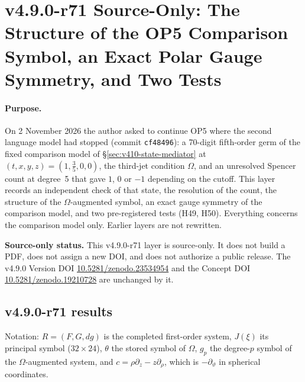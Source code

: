 \clearpage
\section*{v4.9.0-r71 Source-Only: The Structure of the OP5 Comparison Symbol, an Exact Polar Gauge Symmetry, and Two Tests}
\label{sec:v490-r71-op5-symbol}

\paragraph{Purpose.}
On 2 November 2026 the author asked to continue OP5 where the second language model had stopped (commit \texttt{cf48496}): a
70-digit fifth-order germ of the fixed comparison model of \S\ref{sec:v410-state-mediator} at \((t,x,y,z)=(1,\tfrac35,0,0)\),
the third-jet condition \(\Omega\), and an unresolved Spencer count at degree~5 that gave \(1\), \(0\) or \(-1\) depending on the
cutoff.  This layer records an independent check of that state, the resolution of the count, the structure of the
\(\Omega\)-augmented symbol, an exact gauge symmetry of the comparison model, and two pre-registered tests (H49, H50).
Everything concerns the comparison model only.  Earlier layers are not rewritten.

\noindent\textbf{Source-only status.}
This v4.9.0-r71 layer is source-only.  It does not build a PDF, does not assign a new DOI,
and does not authorize a public release.  The v4.9.0 Version DOI
\href{https://doi.org/10.5281/zenodo.23534954}{10.5281/zenodo.23534954} and the Concept DOI
\href{https://doi.org/10.5281/zenodo.19210728}{10.5281/zenodo.19210728} are unchanged by it.

\subsection*{v4.9.0-r71 results}
\label{subsec:v490-r71-results}

Notation: \(R=(F,G,dg)\) is the completed first-order system, \(J(\xi)\) its principal symbol (\(32\times24\)), \(\theta\) the
stored symbol of \(\Omega\), \(g_p\) the degree-\(p\) symbol of the \(\Omega\)-augmented system, and
\(c=\rho\partial_z-z\partial_\rho\), which is \(-\partial_\vartheta\) in spherical coordinates.

